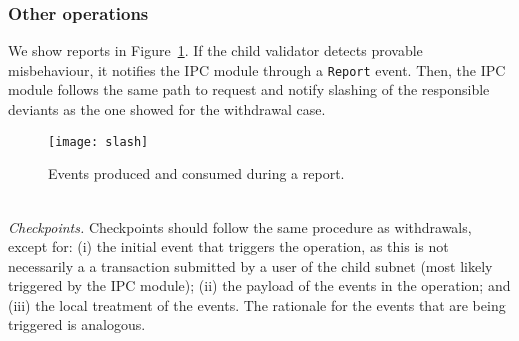\subsubsection{Other operations}
We show reports in Figure~\ref{fig:report}. If the child validator detects provable misbehaviour, it notifies the IPC module through a \texttt{Report} event. Then, the IPC module follows the same path to request and notify slashing of the responsible deviants as the one showed for the withdrawal case.
\begin{figure}
     \centering
     \texttt{[image: slash]}
     \caption{Events produced and consumed during a report.}
     \label{fig:report}
 \end{figure}\\
 \textit{Checkpoints.} Checkpoints should follow the same procedure as withdrawals, except for: (i) the initial event that triggers the operation, as this is not necessarily a a transaction submitted by a user of the child subnet (most likely triggered by the IPC module); (ii) the payload of the events in the operation; and (iii) the local treatment of the events. The rationale for the events that are being triggered is analogous. 
    
